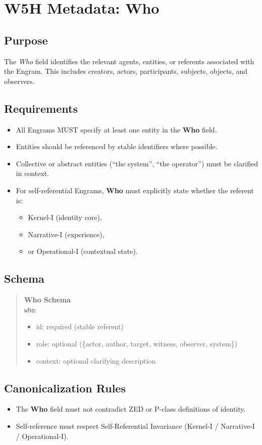\chapter{W5H Metadata: Who}
\label{chap:W5H_Who}

\section{Purpose}

The \emph{Who} field identifies the relevant agents, entities, or referents
associated with the Engram. This includes creators, actors, participants,
subjects, objects, and observers.

\section{Requirements}

\begin{itemize}
    \item All Engrams MUST specify at least one entity in the \textbf{Who} field.
    \item Entities should be referenced by stable identifiers where possible.
    \item Collective or abstract entities (``the system'', ``the operator'') 
          must be clarified in context.
    \item For self-referential Engrams, \textbf{Who} must explicitly state whether
          the referent is:
          \begin{itemize}
              \item Kernel-I (identity core),
              \item Narrative-I (experience),
              \item or Operational-I (contextual state).
          \end{itemize}
\end{itemize}

\section{Schema}

\begin{quote}
\textbf{Who Schema}\\
\texttt{who}: 
\begin{itemize}
    \item id: required (stable referent)
    \item role: optional (\{actor, author, target, witness, observer, system\})
    \item context: optional clarifying description
\end{itemize}
\end{quote}

\section{Canonicalization Rules}

\begin{itemize}
    \item The \textbf{Who} field must not contradict ZED or P-class definitions
          of identity.
    \item Self-reference must respect Self-Referential Invariance 
          (Kernel-I / Narrative-I / Operational-I).
\end{itemize}
